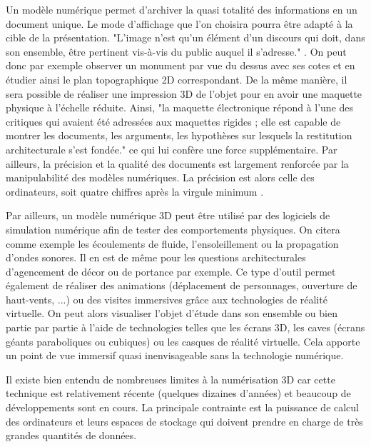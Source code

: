 		Un modèle numérique permet d'archiver la quasi totalité des informations en un document unique. Le mode d'affichage que l'on choisira pourra être adapté à la cible de la présentation. "L’image n’est qu’un élément d’un discours qui doit, dans son ensemble, être pertinent vis-à-vis du public auquel il s’adresse." \cite[p. 20]{golvin}. On peut donc par exemple observer un monument par vue du dessus avec ses cotes et en étudier ainsi le plan topographique 2D correspondant. De la même manière, il sera possible de réaliser une impression 3D de l'objet pour en avoir une maquette physique à l'échelle réduite. Ainsi, "la maquette électronique répond à l’une des critiques qui avaient été adressées aux maquettes rigides ; elle est capable de montrer les documents, les arguments, les hypothèses sur lesquels la restitution architecturale s’est fondée." \cite[p. 26]{golvin} ce qui lui confère une force supplémentaire. Par ailleurs, la précision et la qualité des documents est largement renforcée par la manipulabilité des modèles numériques. La précision est alors celle des ordinateurs, soit quatre chiffres après la virgule minimum \cite[Tableau : Valeur pour les unités matérielles standard d'arithmétique à virgule flottante]{precisionmachine}. 
		 
		 Par ailleurs, un modèle numérique 3D peut être utilisé par des logiciels de simulation numérique afin de tester des comportements physiques. On citera comme exemple les écoulements de fluide, l'ensoleillement ou la propagation d'ondes sonores. Il en est de même pour les questions architecturales d'agencement de décor ou de portance par exemple. Ce type d'outil permet également de réaliser des animations (déplacement de personnages, ouverture de haut-vents, ...) ou des visites immersives grâce aux technologies de réalité virtuelle. On peut alors visualiser l'objet d'étude dans son ensemble ou bien partie par partie à l'aide de technologies telles que les écrans 3D, les caves (écrans géants paraboliques ou cubiques) ou les casques de réalité virtuelle. Cela apporte un point de vue immersif quasi inenvisageable sans la technologie numérique.
		 
Il existe bien entendu de nombreuses limites à la numérisation 3D car cette technique est relativement récente (quelques dizaines d'années) et beaucoup de développements sont en cours. La principale contrainte est la puissance de calcul des ordinateurs et leurs espaces de stockage qui doivent prendre en charge de très grandes quantités de données.

